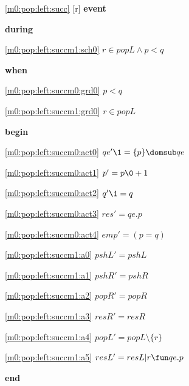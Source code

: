 \noindent \ref{m0:pop:left:succ} [r] \textbf{event}
\begin{block}
\item \textbf{during}
\begin{block}
\item[ \eqref{m0:pop:left:succm1:sch0} ]$r \in popL \land p < q $ %
\end{block}
\item \textbf{when}
\begin{block}
\item[ \eqref{m0:pop:left:succm0:grd0} ]$p < q $ %
\item[ \eqref{m0:pop:left:succm1:grd0} ]$r \in popL $ %
\end{block}
\item \textbf{begin}
\begin{block}
\item[ \eqref{m0:pop:left:succm0:act0} ]$qe' \1= \{ p \} \domsub qe $ %
\item[ \eqref{m0:pop:left:succm0:act1} ]$p' = p\0+1 $ %
\item[ \eqref{m0:pop:left:succm0:act2} ]$q' \1= q $ %
\item[ \eqref{m0:pop:left:succm0:act3} ]$res' = qe.p $ %
\item[ \eqref{m0:pop:left:succm0:act4} ]$emp' = (p = q) $ %
\item[ \eqref{m0:pop:left:succm1:a0} ]$pshL' = pshL $ %
\item[ \eqref{m0:pop:left:succm1:a1} ]$pshR' = pshR $ %
\item[ \eqref{m0:pop:left:succm1:a2} ]$popR' = popR $ %
\item[ \eqref{m0:pop:left:succm1:a3} ]$resR' = resR $ %
\item[ \eqref{m0:pop:left:succm1:a4} ]$popL' = popL \setminus \{ r \} $ %
\item[ \eqref{m0:pop:left:succm1:a5} ]$resL' = resL | r \fun qe.p $ %
\end{block}
\item \textbf{end} \\
\end{block}
